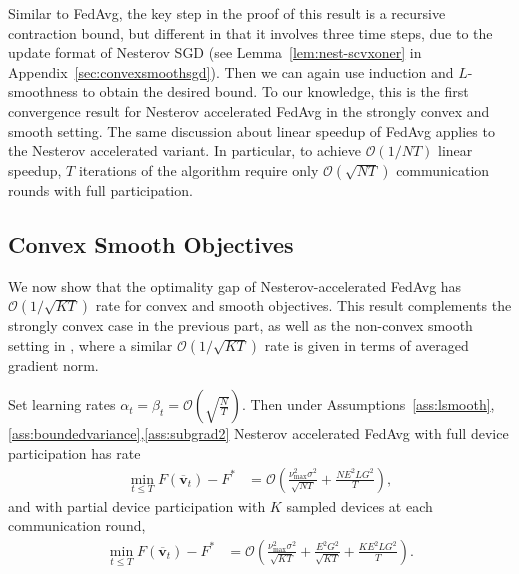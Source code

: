 Similar to FedAvg, the key step in the proof of this result is a recursive contraction bound, but different in that it involves three time steps, due to the update format of Nesterov SGD (see Lemma~\ref{lem:nest-scvxoner} in Appendix~\ref{sec:convexsmoothsgd}). 
Then we can again use induction and $L$-smoothness to obtain the desired bound.
%
To our knowledge, this is the first convergence result for Nesterov
accelerated FedAvg in the strongly convex and smooth setting. The
same discussion about linear speedup of FedAvg applies to the Nesterov
accelerated variant. In particular, to achieve $\mathcal{O}(1/NT)$
linear speedup, $T$ iterations of the algorithm require only $\mathcal{O}(\sqrt{NT})$
communication rounds with full participation. 


\subsection{Convex Smooth Objectives}

We now show that the optimality gap of Nesterov-accelerated FedAvg has $\mathcal{O}(1/\sqrt{KT})$ rate for convex and smooth objectives. This result complements the strongly convex case in the previous
part, as well as the non-convex smooth setting in \cite{huo2020faster,yu2019linear,li2018federated},
where a similar $\mathcal{O}(1/\sqrt{KT})$ rate is given in terms
of averaged gradient norm. 
\begin{theorem}
	\label{thm:Nesterov_cvx}Set learning rates $\alpha_{t}=\beta_{t}=\mathcal{O}(\sqrt{\frac{N}{T}})$. Then under Assumptions~\ref{ass:lsmooth},\ref{ass:boundedvariance},\ref{ass:subgrad2} Nesterov accelerated FedAvg with
	full device participation has rate
	\small{\begin{align*}
		\min_{t\leq T}F(\overline{\mathbf{v}}_{t})-F^{\ast} & =\mathcal{O}\left(\frac{\nu_{\max}^{2}\sigma^{2}}{\sqrt{NT}}+\frac{NE^{2}LG^{2}}{T}\right),
		\end{align*}}
	and with partial device participation with $K$ sampled devices at
	each communication round, 
	\small{\begin{align*}
		\min_{t\leq T}F(\overline{\mathbf{v}}_{t})-F^{\ast} & =\mathcal{O}\left(\frac{\nu_{\max}^{2}\sigma^{2}}{\sqrt{KT}}+\frac{E^{2}G^{2}}{\sqrt{KT}}+\frac{KE^{2}LG^{2}}{T}\right).
		\end{align*}}
\end{theorem}

